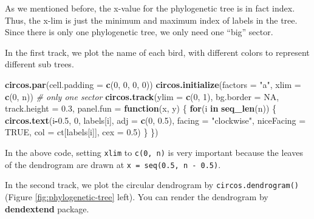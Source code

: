 \documentclass[]{book}
\newenvironment{Shaded}{\begin{snugshade}}{\end{snugshade}}
\newcommand{\KeywordTok}[1]{\textcolor[rgb]{0.13,0.29,0.53}{\textbf{#1}}}
\newcommand{\DataTypeTok}[1]{\textcolor[rgb]{0.13,0.29,0.53}{#1}}
\newcommand{\DecValTok}[1]{\textcolor[rgb]{0.00,0.00,0.81}{#1}}
\newcommand{\FloatTok}[1]{\textcolor[rgb]{0.00,0.00,0.81}{#1}}
\newcommand{\StringTok}[1]{\textcolor[rgb]{0.31,0.60,0.02}{#1}}
\newcommand{\CommentTok}[1]{\textcolor[rgb]{0.56,0.35,0.01}{\textit{#1}}}
\newcommand{\OtherTok}[1]{\textcolor[rgb]{0.56,0.35,0.01}{#1}}
\newcommand{\ControlFlowTok}[1]{\textcolor[rgb]{0.13,0.29,0.53}{\textbf{#1}}}
\newcommand{\OperatorTok}[1]{\textcolor[rgb]{0.81,0.36,0.00}{\textbf{#1}}}
\newcommand{\NormalTok}[1]{#1}
\theoremstyle{definition}
\theoremstyle{definition}
\theoremstyle{remark}
\begin{document}
As we mentioned before, the x-value for the phylogenetic tree is in fact
index. Thus, the x-lim is just the minimum and maximum index of labels
in the tree. Since there is only one phylogenetic tree, we only need one
``big'' sector.

In the first track, we plot the name of each bird, with different colors
to represent different sub trees.

\begin{Shaded}
\begin{Highlighting}[]
\KeywordTok{circos.par}\NormalTok{(}\DataTypeTok{cell.padding =} \KeywordTok{c}\NormalTok{(}\DecValTok{0}\NormalTok{, }\DecValTok{0}\NormalTok{, }\DecValTok{0}\NormalTok{, }\DecValTok{0}\NormalTok{))}
\KeywordTok{circos.initialize}\NormalTok{(}\DataTypeTok{factors =} \StringTok{"a"}\NormalTok{, }\DataTypeTok{xlim =} \KeywordTok{c}\NormalTok{(}\DecValTok{0}\NormalTok{, n)) }\CommentTok{# only one sector}
\KeywordTok{circos.track}\NormalTok{(}\DataTypeTok{ylim =} \KeywordTok{c}\NormalTok{(}\DecValTok{0}\NormalTok{, }\DecValTok{1}\NormalTok{), }\DataTypeTok{bg.border =} \OtherTok{NA}\NormalTok{, }\DataTypeTok{track.height =} \FloatTok{0.3}\NormalTok{, }
    \DataTypeTok{panel.fun =} \ControlFlowTok{function}\NormalTok{(x, y) \{}
        \ControlFlowTok{for}\NormalTok{(i }\ControlFlowTok{in} \KeywordTok{seq_len}\NormalTok{(n)) \{}
            \KeywordTok{circos.text}\NormalTok{(i}\OperatorTok{-}\FloatTok{0.5}\NormalTok{, }\DecValTok{0}\NormalTok{, labels[i], }\DataTypeTok{adj =} \KeywordTok{c}\NormalTok{(}\DecValTok{0}\NormalTok{, }\FloatTok{0.5}\NormalTok{), }
                \DataTypeTok{facing =} \StringTok{"clockwise"}\NormalTok{, }\DataTypeTok{niceFacing =} \OtherTok{TRUE}\NormalTok{,}
                \DataTypeTok{col =}\NormalTok{ ct[labels[i]], }\DataTypeTok{cex =} \FloatTok{0.5}\NormalTok{)}
\NormalTok{        \}}
\NormalTok{\})}
\end{Highlighting}
\end{Shaded}

In the above code, setting \texttt{xlim} to \texttt{c(0,\ n)} is very
important because the leaves of the dendrogram are drawn at
\texttt{x\ =\ seq(0.5,\ n\ -\ 0.5)}.

In the second track, we plot the circular dendrogram by
\texttt{circos.dendrogram()} (Figure \ref{fig:phylogenetic-tree} left).
You can render the dendrogram by \textbf{dendextend} package.
\end{document}
